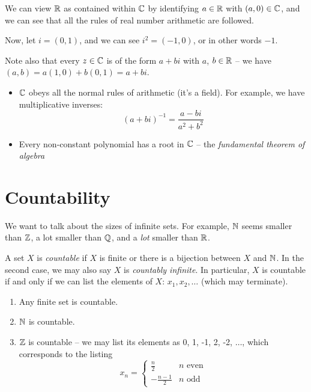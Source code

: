 \documentclass{../template/note}
\begin{document}
    We can view \(\mathbb R\) as contained within \(\mathbb C\) by identifying \(a \in \mathbb R\) with \((a, 0) \in \mathbb C\), and we can see that all the rules of real number arithmetic are followed.
    
    Now, let \(i = (0, 1)\), and we can see \(i^2 = (-1, 0)\), or in other words \(-1\).

    Note also that every \(z \in \mathbb C\) is of the form \(a+bi\) with \(a\), \(b \in \mathbb R\) -- we have \((a, b) = a(1, 0) + b(0, 1) = a + bi\).

    \begin{remark*}
        \begin{itemize}
            \item \(\mathbb C\) obeys all the normal rules of arithmetic (it's a field). For example, we have multiplicative inverses:
            \[
                (a+bi)^{-1} = \frac{a-bi}{a^2+b^2}
            \]
            \item Every non-constant polynomial has a root in \(\mathbb C\) -- the \emph{fundamental theorem of algebra}
        \end{itemize}
    \end{remark*}
    
    \section{Countability}

    We want to talk about the sizes of infinite sets. For example, \(\mathbb N\) seems smaller than \(\mathbb Z\), a lot smaller than \(\mathbb Q\), and a \emph{lot} smaller than \(\mathbb R\).

    \begin{definition}
        A set \(X\) is \emph{countable} if \(X\) is finite or there is a bijection between \(X\) and \(\mathbb N\). In the second case, we may also say \(X\) is \emph{countably infinite}. In particular, \(X\) is countable if and only if we can list the elements of \(X\): \(x_1, x_2, \dots\) (which may terminate).
    \end{definition}
    
    \begin{example}
        \begin{enumerate}[label=\protect\circled{\arabic*}]
            \item Any finite set is countable.
            \item \(\mathbb N\) is countable.
            \item \(\mathbb Z\) is countable -- we may list its elements as 0, 1, -1, 2, -2, \(\dots\), which corresponds to the listing
            \[
                x_n = \begin{cases}
                    \frac{n}{2} & n \text{ even} \\
                    -\frac{n-1}{2} & n \text{ odd}
                \end{cases}
            \]
        \end{enumerate}
    \end{example}
    
\end{document}
